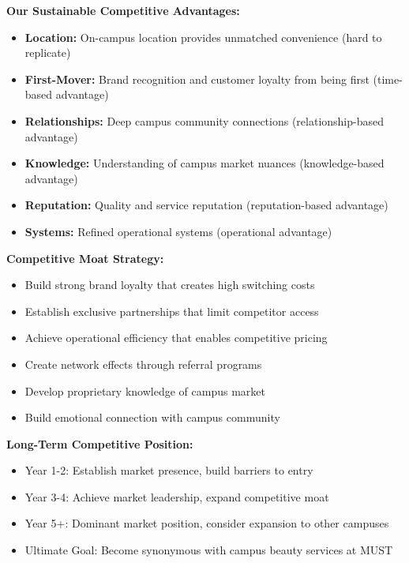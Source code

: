 \documentclass[a4paper,12pt]{article}
\begin{document}
\begin{tcolorbox}[mybox, title=\textbf{Competitive Advantage Sustainability}]
\textbf{Our Sustainable Competitive Advantages:}
\begin{itemize}[leftmargin=1em, itemsep=0pt]
    \item \textbf{Location:} On-campus location provides unmatched convenience (hard to replicate)
    \item \textbf{First-Mover:} Brand recognition and customer loyalty from being first (time-based advantage)
    \item \textbf{Relationships:} Deep campus community connections (relationship-based advantage)
    \item \textbf{Knowledge:} Understanding of campus market nuances (knowledge-based advantage)
    \item \textbf{Reputation:} Quality and service reputation (reputation-based advantage)
    \item \textbf{Systems:} Refined operational systems (operational advantage)
\end{itemize}

\textbf{Competitive Moat Strategy:}
\begin{itemize}[leftmargin=1em, itemsep=0pt]
    \item Build strong brand loyalty that creates high switching costs
    \item Establish exclusive partnerships that limit competitor access
    \item Achieve operational efficiency that enables competitive pricing
    \item Create network effects through referral programs
    \item Develop proprietary knowledge of campus market
    \item Build emotional connection with campus community
\end{itemize}

\textbf{Long-Term Competitive Position:}
\begin{itemize}[leftmargin=1em, itemsep=0pt]
    \item Year 1-2: Establish market presence, build barriers to entry
    \item Year 3-4: Achieve market leadership, expand competitive moat
    \item Year 5+: Dominant market position, consider expansion to other campuses
    \item Ultimate Goal: Become synonymous with campus beauty services at MUST
\end{itemize}
\end{tcolorbox}
\end{document}
